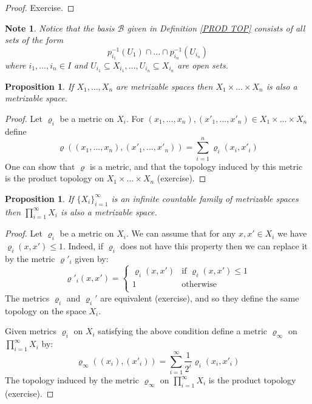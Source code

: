 \documentclass[11pt, letterpaper, oneside]{report}
\theoremstyle{pplain}
\newtheorem{proposition}[theorem]{Proposition}
\newtheorem{ITERMVALUE THM}[theorem]{Intermediate Value Theorem}
\newtheorem{HEINEBOREL THM}[theorem]{Heine-Borel Theorem}
\newtheorem{UMETR THM}[theorem]{Urysohn Metrization Theorem}
\newtheorem{UMETR2 THM}[theorem]{Urysohn Metrization Theorem (v.2)}
\theoremstyle{ddefinition}
\newtheorem{note}[theorem]{Note}
\theoremstyle{nnn}
\newtheorem{TDA NN}[theorem]{Topological Data Analysis. }
\theoremstyle{eexercise}
\newcommand{\BB}{{\mathcal B}}
\begin{document}
\begin{proof}
Exercise. 
\end{proof}

\begin{note}
\label{PROD BASIS NOTE}
Notice that the basis $\BB$ given in Definition  \ref{PROD TOP}  consists of all sets of the form
$$p_{i_{1}}^{-1}(U_{1})\cap \dots \cap  p_{i_{n}}^{-1}(U_{i_{n}})$$
where $i_{1}, \dots, i_{n}\in I$ and 
 $U_{i_{1}}\subseteq X_{i_{1}}, \dots,  U_{i_{n}}\subseteq X_{i_{n}}$ are open  sets.    
\end{note}


\begin{proposition}
\label{FINITE PROD OF METRIC SP PROP}
If $X_{1}, \dots, X_{n}$ are metrizable spaces then $X_{1}\times \dots \times X_{n}$
is also a metrizable space. 
\end{proposition}

\begin{proof}
Let $\varrho_{i}$ be a metric on $X_{i}$. For 
$(x_{1}, \dots, x_{n}), (x'_{1}, \dots, x'_{n}) \in  X_{1}\times \dots \times X_{n}$ define 
$$\varrho((x_{1}, \dots, x_{n}), (x'_{1}, \dots, x'_{n})) = \sum_{i=1}^{n} \varrho_{i}(x_{i}, x'_{i})$$
One can show that $\varrho$ is a metric, and that the topology induced by this metric 
is the product topology on $X_{1}\times \dots \times X_{n}$ (exercise).
\end{proof}


\begin{proposition}
\label{CONTABLE PROD OF METRIC SP PROP}
If $\{X_{i}\}_{i=1}^{\infty}$ is an infinite countable family of metrizable spaces then $\prod_{i=1}^{\infty} X_{i}$
is also a metrizable space. 
\end{proposition}

\begin{proof}
Let $\varrho_{i}$ be a metric on $X_{i}$. We can assume that for any $x, x'\in X_{i}$
we have $\varrho_{i}(x, x') \leq 1$. Indeed, if $\varrho_{i}$ does not have this property
then we can replace it by the metric $\varrho'_{i}$ given by:
$$
\varrho'_{i}(x, x') =
\begin{cases}
\varrho_{i}(x, x') & \text{if $\varrho_{i}(x, x') \leq 1$} \\
1 & \text{otherwise} \\
\end{cases}
$$
The metrics $\varrho_{i}$ and $\varrho_{i}'$ are equivalent (exercise), and so they define the
same topology on the space $X_{i}$.

Given metrics $\varrho_{i}$ on $X_{i}$ satisfying the above condition define a metric
$\varrho_{\infty}$ on $\prod_{i=1}^{\infty} X_{i}$ by:
$$\varrho_{\infty}((x_{i}), (x'_{i})) = \sum_{i=1}^{\infty} \frac{1}{2^{i}}\varrho_{i}(x_{i}, x'_{i})$$
The topology induced by the metric $\varrho_{\infty}$ on $\prod_{i=1}^{\infty}X_{i}$ is the 
product topology (exercise). 
\end{proof}
\end{document}

